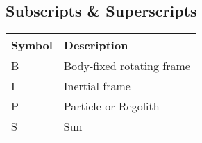 \subsection*{Subscripts \& Superscripts}
\begin{longtable}[l]{p{100pt} p{230pt}}
    \textbf{Symbol} & \textbf{Description}                                              \\
    \hline
    B        & Body-fixed rotating frame                                                \\
    I        & Inertial frame                                                           \\
    P        & Particle or Regolith                                                     \\
    S        & Sun                                                                      \\
\end{longtable}
